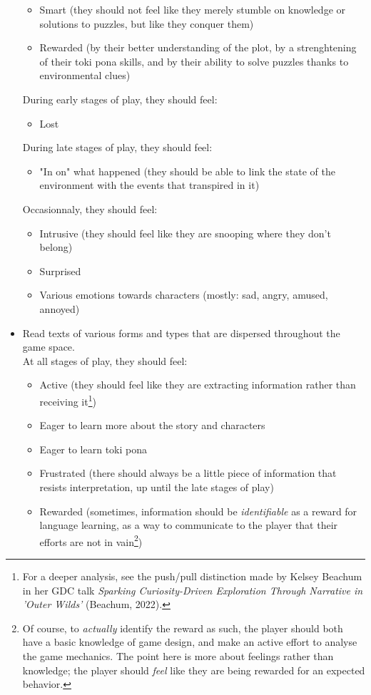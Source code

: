 \documentclass{scrartcl}
\begin{document}
\begin{itemize}
\begin{itemize}
					\item Smart (they should not feel like they merely stumble on knowledge or solutions to puzzles, but like they conquer them)
					\item Rewarded (by their better understanding of the plot, by a strenghtening of their toki pona skills, and by their ability to solve puzzles thanks to environmental clues)
				\end{itemize}
				During early stages of play, they should feel: 
				\begin{itemize}
					\item Lost
				\end{itemize}
				During late stages of play, they should feel:
				\begin{itemize}
					\item "In on" what happened (they should be able to link the state of the environment with the events that transpired in it)
				\end{itemize}
				Occasionnaly, they should feel:
				\begin{itemize}
					\item Intrusive (they should feel like they are snooping where they don't belong)
					\item Surprised
					\item Various emotions towards characters (mostly: sad, angry, amused, annoyed)
				\end{itemize}
				\item Read texts of various forms and types that are dispersed throughout the game space.\\
				At all stages of play, they should feel:
				\begin{itemize}
					\item Active (they should feel like they are extracting information rather than receiving it\footnote{For a deeper analysis, see the push/pull distinction made by Kelsey Beachum in her GDC talk \textit{Sparking Curiosity-Driven Exploration Through Narrative in 'Outer Wilds'} (Beachum, 2022).})
					\item Eager to learn more about the story and characters
					\item Eager to learn toki pona
					\item Frustrated (there should always be a little piece of information that resists interpretation, up until the late stages of play)
					\item Rewarded (sometimes, information should be \textit{identifiable} as a reward for language learning, as a way to communicate to the player that their efforts are not in vain\footnote{Of course, to \textit{actually} identify the reward as such, the player should both have a basic knowledge of game design, and make an active effort to analyse the game mechanics. The point here is more about feelings rather than knowledge; the player should \textit{feel} like they are being rewarded for an expected behavior.})

\end{itemize}
\end{itemize}
\end{document}
